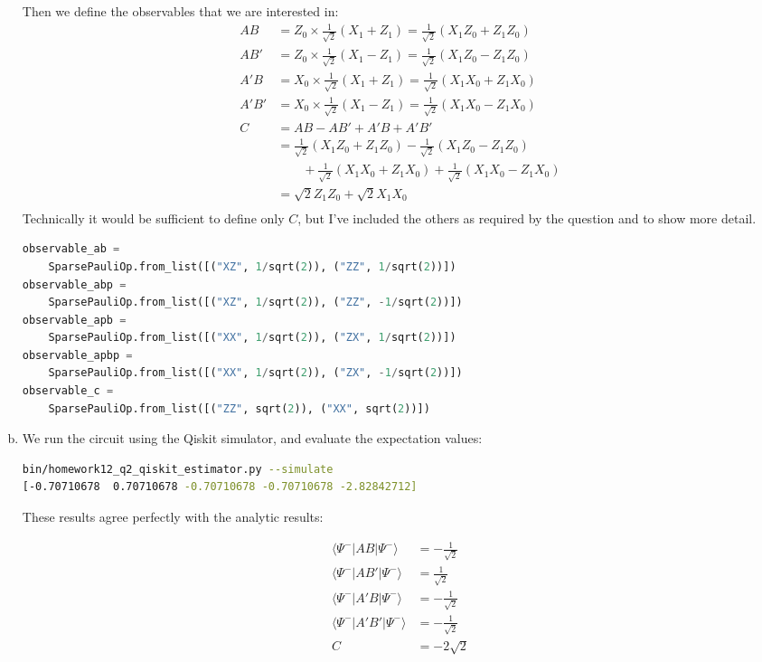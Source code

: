 \documentclass[12pt]{extarticle}
\begin{document}
\begin{enumerate}[(a)]
Then we define the observables that we are interested in:
\begin{align*}
AB & = Z_0 \times \frac{1}{\sqrt{2}} (X_1 + Z_1) = \frac{1}{\sqrt{2}} (X_1 Z_0 + Z_1 Z_0) \\
AB' & = Z_0 \times \frac{1}{\sqrt{2}} (X_1 - Z_1) = \frac{1}{\sqrt{2}} (X_1 Z_0 - Z_1 Z_0) \\
A'B & = X_0 \times \frac{1}{\sqrt{2}} (X_1 + Z_1) = \frac{1}{\sqrt{2}} (X_1 X_0 + Z_1 X_0) \\
A'B' & = X_0 \times \frac{1}{\sqrt{2}} (X_1 - Z_1) = \frac{1}{\sqrt{2}} (X_1 X_0 - Z_1 X_0) \\
C & = AB - AB' + A'B + A'B' \\
& = \frac{1}{\sqrt{2}}(X_1 Z_0 + Z_1 Z_0) - \frac{1}{\sqrt{2}} (X_1 Z_0 - Z_1 Z_0) \\
& \qquad + \frac{1}{\sqrt{2}} (X_1 X_0 + Z_1 X_0) + \frac{1}{\sqrt{2}} (X_1 X_0 - Z_1 X_0) \\
& = \sqrt{2} Z_1 Z_0 + \sqrt{2} X_1 X_0 \\
\end{align*}
Technically it would be sufficient to define only $C$, but I've included the others as required by the question and to show more detail.
\begin{small}
\begin{lstlisting}[language=python]
observable_ab =
    SparsePauliOp.from_list([("XZ", 1/sqrt(2)), ("ZZ", 1/sqrt(2))])
observable_abp =
    SparsePauliOp.from_list([("XZ", 1/sqrt(2)), ("ZZ", -1/sqrt(2))])
observable_apb =
    SparsePauliOp.from_list([("XX", 1/sqrt(2)), ("ZX", 1/sqrt(2))])
observable_apbp =
    SparsePauliOp.from_list([("XX", 1/sqrt(2)), ("ZX", -1/sqrt(2))])
observable_c =
    SparsePauliOp.from_list([("ZZ", sqrt(2)), ("XX", sqrt(2))])
\end{lstlisting}
\end{small}

\item

We run the circuit using the Qiskit simulator, and evaluate the expectation values:

\begin{lstlisting}[language=bash]
bin/homework12_q2_qiskit_estimator.py --simulate
[-0.70710678  0.70710678 -0.70710678 -0.70710678 -2.82842712]
\end{lstlisting}

These results agree perfectly with the analytic results:

\begin{align*}
\langle \Psi^{-}|AB|\Psi^{-}\rangle & = -\frac{1}{\sqrt{2}} \\
\langle \Psi^{-}|AB'|\Psi^{-}\rangle & = \frac{1}{\sqrt{2}} \\
\langle \Psi^{-}|A'B|\Psi^{-}\rangle & = -\frac{1}{\sqrt{2}} \\
\langle \Psi^{-}|A'B'|\Psi^{-}\rangle & = -\frac{1}{\sqrt{2}} \\
C & = -2\sqrt{2}
\end{align*}


\end{enumerate}
\end{document}
